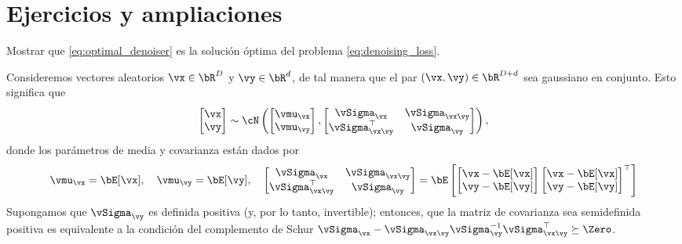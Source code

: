 \documentclass[../../book-main.tex]{subfiles}
\begin{document}
\section{Ejercicios y ampliaciones}

\begin{exercise}
    Mostrar que \eqref{eq:optimal_denoiser} es la solución óptima del
    problema \eqref{eq:denoising_loss}.
\end{exercise}

\begin{exercise}\label{exercise:conditional_gaussian}
    Consideremos vectores aleatorios $\vx \in \bR^D$ y $\vy \in \bR^d$,
    de tal manera que el
    par $(\vx, \vy) \in \bR^{D + d}$ sea gaussiano en conjunto. Esto significa que
    \begin{equation*}
        \begin{bmatrix}
            \vx \\
            \vy
        \end{bmatrix}
        \sim
        \cN \left(
            \begin{bmatrix}
                \vmu_{\vx} \\
                \vmu_{\vy}
            \end{bmatrix}
            ,
            \begin{bmatrix}
                \vSigma_{\vx} & \vSigma_{\vx\vy} \\
                \vSigma_{\vx\vy}^\top & \vSigma_{\vy}
            \end{bmatrix}
        \right),
    \end{equation*}
    donde los parámetros de media y covarianza están dados por
    \begin{equation*}
        \vmu_{\vx} = \bE[\vx],\quad \vmu_{\vy} = \bE[\vy],\quad
        \begin{bmatrix}
            \vSigma_{\vx} & \vSigma_{\vx\vy} \\
            \vSigma_{\vx\vy}^\top & \vSigma_{\vy}
        \end{bmatrix}
        =
        \bE\left[
            \begin{bmatrix}
                \vx - \bE[\vx] \\
                \vy - \bE[\vy]
            \end{bmatrix}
            \begin{bmatrix}
                \vx - \bE[\vx] \\
                \vy - \bE[\vy]
            \end{bmatrix}^\top
        \right]
    \end{equation*}
    Supongamos que $\vSigma_{\vy}$ es definida positiva (y, por lo tanto,
    invertible); entonces,
    que la matriz de covarianza sea semidefinida positiva es equivalente
    a la condición del complemento de Schur
    $\vSigma_{\vx} - \vSigma_{\vx\vy}
    \vSigma_{\vy}^{-1}
    \vSigma_{\vx\vy}^\top \succeq \Zero$.


\end{exercise}
\end{document}
